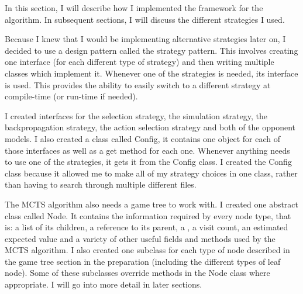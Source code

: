 

In this section, I will describe how I implemented the framework for the \mcts algorithm. In subsequent sections, I will discuss the different strategies I used.

Because I knew that I would be implementing alternative strategies later on, I decided to use a design pattern called the strategy pattern. This involves creating one interface (for each different type of strategy) and then writing multiple classes which implement it. Whenever one of the strategies is needed, its interface is used. This provides the ability to easily switch to a different strategy at compile-time (or run-time if needed). 

I created interfaces for the selection strategy, the simulation strategy, the backpropagation strategy, the action selection strategy and both of the opponent models. I also created a class called Config, it contains one object for each of those interfaces as well as a get method for each one. Whenever anything needs to use one of the strategies, it gets it from the Config class. I created the Config class because it allowed me to make all of my strategy choices in one class, rather than having to search through multiple different files. 



The MCTS algorithm also needs a game tree to work with. I created one abstract class called Node. It contains the information required by every node type, that is: a list of its children, a reference to its parent, a \gs, a visit count, an estimated expected value and a variety of other useful fields and methods used by the MCTS algorithm. I also created one subclass for each type of node described in the game tree section in the preparation (including the different types of leaf node). Some of these subclasses override methods in the Node class where appropriate. I will go into more detail in later sections.


